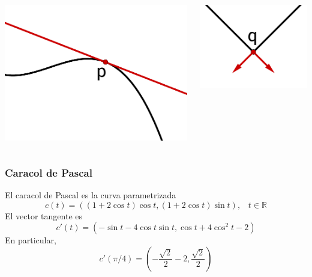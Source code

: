 \documentclass{beamer}
\def\realR{\mathbb{R}} %
\begin{document}
\begin{frame}
\begin{columns}
    \begin{center}
        \includegraphics[scale=0.25]{curva-suave}
    \end{center}
    \begin{center}
        \includegraphics[scale=0.35]{curva-no-suave}
    \end{center}
\end{columns}
\end{frame}


\begin{frame}
    \frametitle{Caracol de Pascal}
    El caracol de Pascal es la curva parametrizada
    $$ c(t)=((1+2\cos{t})\cos{t},(1+2\cos{t})\sin{t})\text{,} \quad t \in \realR$$
    El vector tangente es
    $$ c'(t)=(-\sin{t}-4\cos{t}\sin{t},\cos{t}+4\cos^{2}{t}-2)$$
    En particular,
    $$ c'(\pi/4) = (-\frac{\sqrt{2}}{2}-2,\frac{\sqrt{2}}{2})$$
\end{frame}
\end{document}
